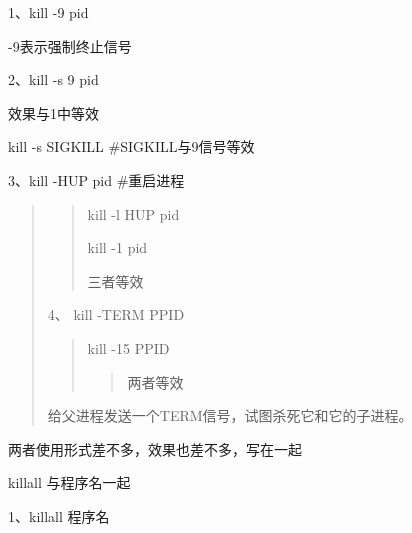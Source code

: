 \documentclass[letterpaper,10pt]{sphinxmanual}
\begin{document}
1、kill -9 pid

-9表示强制终止信号

2、kill -s 9 pid

效果与1中等效

kill -s SIGKILL \#SIGKILL与9信号等效

3、kill -HUP pid \#重启进程
\begin{quote}
\begin{quote}

kill -l HUP pid

kill -1 pid

三者等效
\end{quote}

4、 kill -TERM PPID
\begin{quote}

kill -15 PPID
\begin{quote}

两者等效
\end{quote}
\end{quote}

给父进程发送一个TERM信号，试图杀死它和它的子进程。
\end{quote}

两者使用形式差不多，效果也差不多，写在一起

killall 与程序名一起

1、killall 程序名



\renewcommand{\indexname}{索引}
\printindex
\end{document}
